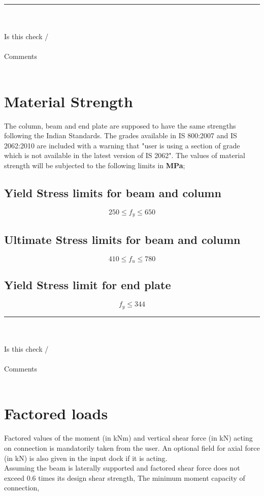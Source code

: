 \documentclass[11.5pt,a4paper,oneside]{report}
\newcommand{\okornot}{ \vspace{15mm} \hrule
	\noindent \\ \\
	Is this check \qquad
	\CheckBox[checked=False, name= ok]{\textbf{Ok}} \qquad / 
	\CheckBox[checked=False, name= notok]{\textbf{Not Ok}}\\ \\
	Comments \\ \\
	\noindent
	\TextField[name=multilinetextbox, multiline=true, width=1.0\linewidth,height=2in]{}}
\begin{document}
\begin{Form}
\okornot
\chapter{Material Strength}
%
The column, beam and end plate are supposed to have the same strengths following the Indian Standards. The grades available in IS 800:2007 and IS 2062:2010 are included with a warning that "user is using a section of grade which is not available in the latest version of IS 2062". The values of material strength will be subjected to the following limits in \textbf{MPa};
\section{Yield Stress limits for beam and column}
\qquad {}
	\begin{equation}
		250 \leq f_{y} \leq 650
	\end{equation}
	
\section{Ultimate Stress limits for beam and column}
\qquad {}
	\begin{equation}
		410 \leq f_{u} \leq 780
	\end{equation}
	
\section{Yield Stress limit for end plate}
\qquad {}
\begin{equation}
	f_{y} \leq 344
\end{equation}

	\okornot

\chapter{Factored loads}
%
Factored values of the moment (in kNm) and vertical shear force  (in kN) acting on connection is mandatorily taken from the user. An optional field for axial force (in kN) is also given in the input dock if it is acting.\\
Assuming the beam is laterally supported and factored shear force does not exceed 0.6 times its design shear strength, 
The minimum moment capacity of connection,


\end{Form}
\end{document}

